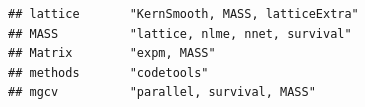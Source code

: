 \documentclass[]{article}
\begin{document}
\begin{verbatim}
## lattice       "KernSmooth, MASS, latticeExtra"                                                                                                                                                                                                                                                                                                                                                                                                                                                                                                                                                          
## MASS          "lattice, nlme, nnet, survival"                                                                                                                                                                                                                                                                                                                                                                                                                                                                                                                                                           
## Matrix        "expm, MASS"                                                                                                                                                                                                                                                                                                                                                                                                                                                                                                                                                                              
## methods       "codetools"                                                                                                                                                                                                                                                                                                                                                                                                                                                                                                                                                                               
## mgcv          "parallel, survival, MASS"                                                                                                                                                                                                                                                                                                                                                                                                                                                                                                                                                                

\end{verbatim}
\end{document}
